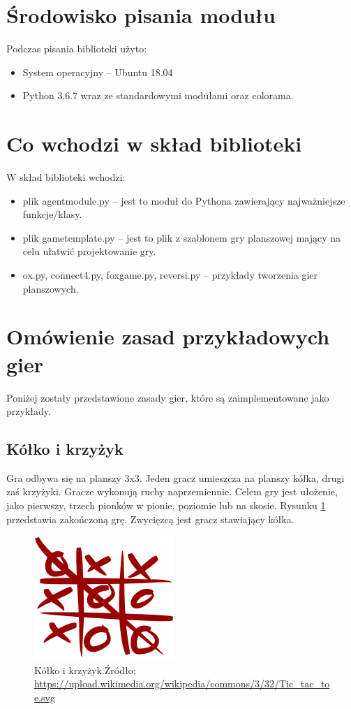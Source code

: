 \documentclass[polish,shortabstract,inz]{iithesis}
\begin{document}
\section{Środowisko pisania modułu}
Podczas pisania biblioteki użyto:
\begin{itemize}
  \item System operacyjny -- Ubuntu 18.04
  \item Python 3.6.7 wraz ze standardowymi modułami oraz colorama.
\end{itemize}
\section{Co wchodzi w skład biblioteki}
W skład biblioteki wchodzi:
\begin{itemize}
  \item plik agent\textunderscore module.py -- jest to moduł do Pythona zawierający najważniejsze funkcje/klasy.
  \item plik game\textunderscore template.py -- jest to plik z szablonem gry planszowej mający na celu ułatwić projektowanie gry.
  \item ox.py, connect4.py, fox\textunderscore game.py, reversi.py -- przykłady tworzenia gier planszowych.
\end{itemize}


\section{Omówienie zasad przykładowych gier}
Poniżej zostały przedstawione zasady gier, które są zaimplementowane jako przykłady.
\subsection{Kółko i krzyżyk}
Gra odbywa się na planszy 3x3.
Jeden gracz umieszcza na planszy kółka, drugi zaś krzyżyki.
Gracze wykonują ruchy naprzemiennie. Celem gry jest ułożenie, jako pierwszy, trzech pionków w pionie, poziomie lub na skosie.
Rysunku \ref{fig:oxwin} przedstawia zakończoną grę.
Zwycięzcą jest gracz stawiający kółka.

\begin{figure}[H]
  \includegraphics{./images/tictactoe.png}
  \centering
  \caption{Kółko i krzyżyk.\newline Źródło:\,\url{https://upload.wikimedia.org/wikipedia/commons/3/32/Tic\_tac\_toe.svg}}
  \label{fig:oxwin}
\end{figure}
\end{document}
